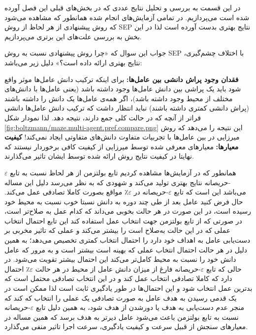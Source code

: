 در این قسمت به بررسی و تحلیل نتایج عددی که در بخش‌های قبلی این فصل آورده شده است می‌پردازیم. در تمامی آزمایش‌های انجام شده همانطور که مشاهده می‌شود که روش پیشنهادی از هر لحاظ از روش SEP نتایج بهتری بدست آورده است لذا در این بخش به بررسی علت‌های این برتری می‌پردازیم.

جواب این سوال که «چرا روش پیشنهادی نسبت به روش SEP با اختلاف چشم‌گیری، نتایج بهتری ارائه داده است؟» دلیل زیر می‌باشد:
\begin{enumerate}
 \textbf{فقدان وجود پراش دانشی بین عامل‌ها:} برای اینکه ترکیب دانش عامل‌ها موثر واقع شود باید یک پراشی بین دانش عامل‌ها وجود داشته باشد (یعنی عامل‌ها با دانش‌های مختلف از محیط وجود داشته باشد)، اگر همه‌ی عامل‌ها یک دانش را داشته باشند (پراش دانشی کمتری داشته باشند) نباید انتظار داشت که ترکیب دانش عامل‌ها دانشی فراتر از آنچه که در حالت کلی جمع دارند، نتیجه دهد. لذا نمودار شکل \ref{fig:boltzmann/maze.multi-agent.pref.compare.png} این نتیجه را می‌دهد که روش میرزایی در بین عامل‌ها با تجربیات متفاوت دانش‌های متفاوتی ایجاد نمی‌کند!
 \textbf{کیفیت معیارها:} معیار‌های معرفی شده توسط میرزایی از کیفیت کافی برخوردار نیستند که نهایتا در کیفیت نتایج روش ارائه شده توسط ایشان تاثیر می‌گذارند.
\end{enumerate}

همانطور که در آزمایش‌ها مشاهده کردیم تابع بولتزمن از هر لحاظ نسبت به تابع $\varepsilon$-حریصانه نتایج بهتری تولید می‌کند و شهودی که به نظر می‌رسد دلیل این مساله می‌باشد این است که تابع $\varepsilon$-حریصانه در $\varepsilon$٪ مواقع بصورت کاملا تصادفی عمل می‌کند. حال فرض کنید عامل بعد از طی چند دوره به دانش نسبتا خوب نسبت به محیط خود رسیده است، در این صورت در هر حالت بخوبی می‌داند که کدام عمل به صلاح‌تر است، در صورتی که از تابع بولتزمن جهت انتخاب عمل استفاده کند این تابع احتمال انتخاب عملی که در این حالت به‌صلاح است را بیشتر می‌کند و عملی که تاثیر مخربی بر دست‌یابی عامل به اهداف خود دارد را احتمال انتخاب کمتری تخصیص می‌دهد؛ به همین دلیل در هر حالت احتمال انتخاب عملی که بهینه‌ است بیشتر است و به مرور که عامل دانش خود را نسبت به محیط کامل‌تر می‌کند این احتمال بیشتر تقویت می‌شود. در حالی که تابع $\varepsilon$-حریصانه فارغ از میزان دانش عامل از محیط در هر حالت $\varepsilon$٪ احتمال دارد که کاملا تصادفی انتخاب عمل کند و در این انتخاب تصادفی محتمل است که بدترین عمل انتخاب شود و این احتمال‌ها در طور یادگیری ثابت است لذا ممکن است در یک قدمی رسیدن به هدف عامل به صورت تصادفی یک عملی را انتخاب که کند که منجر عدم دست‌یابی به هدف یا دورشدن از هدف شود، به همین دلیل تابع $\varepsilon$-حریصانه نسبت به تابع بولتزمن باعث می‌‌شود عامل دیرتر به هدف برسد که همین مساله در معیارهای سنجش از قبیل سرعت و کیفیت یادگیری، سرعت اجرا تاثیر منفی می‌گذارد.

